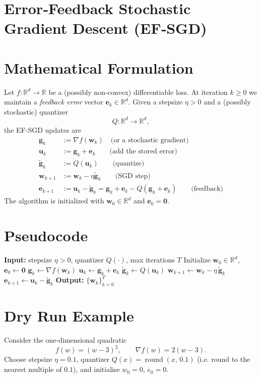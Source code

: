 \documentclass{article}
\newcommand{\R}{\mathbb{R}}
\begin{document}
\section*{Error‑Feedback Stochastic Gradient Descent (EF‑SGD)}

\section*{Mathematical Formulation}
Let $f:\R^{d}\rightarrow\R$ be a (possibly non‑convex) differentiable loss.  
At iteration $k\ge 0$ we maintain a \emph{feedback error} vector $\bm e_k\in\R^{d}$.  
Given a stepsize $\eta>0$ and a (possibly stochastic) quantizer 
\[
Q:\R^{d}\rightarrow\R^{d},
\]
the EF‑SGD updates are
\begin{align}
\bm g_k &:= \nabla f(\bm w_k) \quad\text{(or a stochastic gradient)}\label{eq:grad}\\
\bm u_k &:= \bm g_k+\bm e_k \qquad\text{(add the stored error)}\tag{1}\\
\tilde{\bm g}_k &:= Q(\bm u_k) \qquad\text{(quantize)}\tag{2}\\
\bm w_{k+1} &:= \bm w_k - \eta \tilde{\bm g}_k \qquad\text{(SGD step)}\tag{3}\\
\bm e_{k+1} &:= \bm u_k-\tilde{\bm g}_k = \bm g_k+\bm e_k-Q(\bm g_k+\bm e_k) \qquad\text{(feedback)}\tag{4}
\end{align}
The algorithm is initialized with $\bm w_0\in\R^{d}$ and $\bm e_0=\bm 0$.

\section*{Pseudocode}
\begin{algorithm}[H]
\caption{EF‑SGD}
\begin{algorithmic}[1]
\State \textbf{Input:} stepsize $\eta>0$, quantizer $Q(\cdot)$, max iterations $T$
\State Initialize $\bm w_0\in\R^{d}$, $\bm e_0\gets\bm 0$
    \State $\bm g_k\gets \nabla f(\bm w_k)$ 
    \State $\bm u_k\gets \bm g_k+\bm e_k$
    \State $\tilde{\bm g}_k\gets Q(\bm u_k)$
    \State $\bm w_{k+1}\gets \bm w_k-\eta\,\tilde{\bm g}_k$
    \State $\bm e_{k+1}\gets \bm u_k-\tilde{\bm g}_k$
\EndFor
\State \textbf{Output:} $\{\bm w_k\}_{k=0}^{T}$
\end{algorithmic}
\end{algorithm}

\section*{Dry Run Example}
Consider the one‑dimensional quadratic 
\[
f(w)=(w-3)^2,\qquad \nabla f(w)=2(w-3).
\]
Choose stepsize $\eta=0.1$, quantizer $Q(x)=\operatorname{round}(x,\,0.1)$
(i.e. round to the nearest multiple of $0.1$), and initialise $w_0=0$, $e_0=0$.
\end{document}

